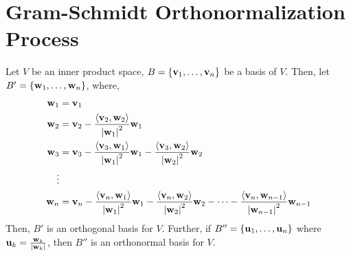 \documentclass[letterpaper,12pt]{article}
\begin{document}
\section*{Gram-Schmidt Orthonormalization Process}


\begin{theorem}
Let $V$ be an inner product space, $B = \left\{ \mathbf{v}_1, \dots, \mathbf{v}_n \right\}$ be a basis of $V$. Then, let $B' = \left\{ \mathbf{w}_1, \dots, \mathbf{w}_n \right\}$, where,
\begin{align*}
    \mathbf{w}_1 & = \mathbf{v}_1 \\
    \mathbf{w}_2 & = \mathbf{v}_2 - \frac{\left< \mathbf{v}_2, \mathbf{w}_2 \right>}{\left\lvert \mathbf{w}_1 \right\rvert^2} \mathbf{w}_1 \\ \mathbf{w}_3 & = \mathbf{v}_3 - \frac{\left< \mathbf{v}_3, \mathbf{w}_1 \right>}{\left\lvert \mathbf{w}_1 \right\rvert^2} \mathbf{w}_1 - \frac{\left< \mathbf{v}_3, \mathbf{w}_2 \right>}{\left\lvert \mathbf{w}_2 \right\rvert^2} \mathbf{w}_2 \\
    \vdots & \\
    \mathbf{w}_n & = \mathbf{v}_n - \frac{\left< \mathbf{v}_n, \mathbf{w}_1 \right>}{\left\lvert \mathbf{w}_1 \right\rvert^2} \mathbf{w}_1 - \frac{\left< \mathbf{v}_n, \mathbf{w}_2 \right>}{\left\lvert \mathbf{w}_2 \right\rvert^2} \mathbf{w}_2 - \dots - \frac{\left< \mathbf{v}_n, \mathbf{w}_{n-1} \right>}{\left\lvert \mathbf{w}_{n-1} \right\rvert^2} \mathbf{w}_{n-1}
\end{align*}
Then, $B'$ is an orthogonal basis for $V$. Further, if $B'' = \left\{ \mathbf{u}_1, \dots, \mathbf{u}_n \right\}$ where $\mathbf{u}_k = \frac{\mathbf{w}_k}{\left\lvert \mathbf{w}_k \right\rvert}$, then $B''$ is an orthonormal basis for $V$.
\end{theorem}
\end{document}
